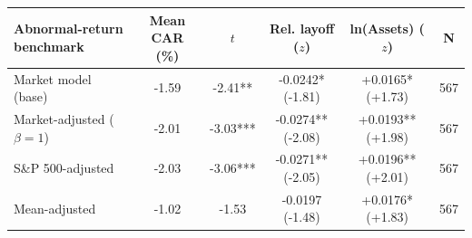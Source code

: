\begin{tabular}{lccccc}
\toprule
Abnormal-return benchmark & Mean CAR (\%) & $t$ & Rel. layoff ($z$) & ln(Assets) ($z$) & N \\
\midrule
Market model (base) & -1.59 & -2.41** & -0.0242* (-1.81) & +0.0165* (+1.73) & 567 \\
Market-adjusted ($\beta{=}1$) & -2.01 & -3.03*** & -0.0274** (-2.08) & +0.0193** (+1.98) & 567 \\
S\&P 500-adjusted & -2.03 & -3.06*** & -0.0271** (-2.05) & +0.0196** (+2.01) & 567 \\
Mean-adjusted & -1.02 & -1.53 & -0.0197 (-1.48) & +0.0176* (+1.83) & 567 \\
\bottomrule
\end{tabular}